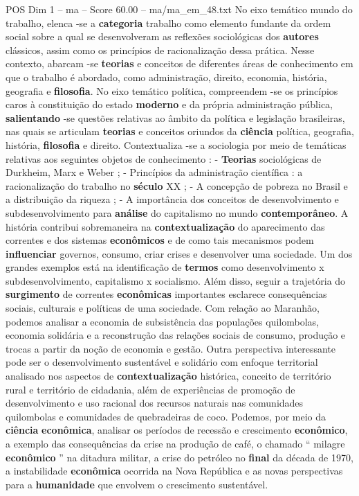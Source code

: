 \begin{textsample}{POS Dim 1 – ma – Score 60.00 – ma/ma\_em\_48.txt}
No eixo temático mundo do trabalho, elenca -se a \textbf{categoria} trabalho como elemento fundante da ordem social sobre a qual se desenvolveram as reflexões sociológicas dos \textbf{autores} clássicos, assim como os princípios de racionalização dessa prática.
Nesse contexto, abarcam -se \textbf{teorias} e conceitos de diferentes áreas de conhecimento em que o trabalho é abordado, como administração, direito, economia, história, geografia e \textbf{filosofia}.
No eixo temático política, compreendem -se os princípios caros à constituição do estado \textbf{moderno} e da própria administração pública, \textbf{salientando} -se questões relativas ao âmbito da política e legislação brasileiras, nas quais se articulam \textbf{teorias} e conceitos oriundos da \textbf{ciência} política, geografia, história, \textbf{filosofia} e direito.
Contextualiza -se a sociologia por meio de temáticas relativas aos seguintes objetos de conhecimento : - \textbf{Teorias} sociológicas de Durkheim, Marx e Weber ; - Princípios da administração científica : a racionalização do trabalho no \textbf{século} XX ; - A concepção de pobreza no Brasil e a distribuição da riqueza ; - A importância dos conceitos de desenvolvimento e subdesenvolvimento para \textbf{análise} do capitalismo no mundo \textbf{contemporâneo}.
A história contribui sobremaneira na \textbf{contextualização} do aparecimento das correntes e dos sistemas \textbf{econômicos} e de como tais mecanismos podem \textbf{influenciar} governos, consumo, criar crises e desenvolver uma sociedade.
Um dos grandes exemplos está na identificação de \textbf{termos} como desenvolvimento x subdesenvolvimento, capitalismo x socialismo.
Além disso, seguir a trajetória do \textbf{surgimento} de correntes \textbf{econômicas} importantes esclarece consequências sociais, culturais e políticas de uma sociedade.
Com relação ao Maranhão, podemos analisar a economia de subsistência das populações quilombolas, economia solidária e a reconstrução das relações sociais de consumo, produção e trocas a partir da noção de economia e gestão.
Outra perspectiva interessante pode ser o desenvolvimento sustentável e solidário com enfoque territorial analisado nos aspectos de \textbf{contextualização} histórica, conceito de território rural e território de cidadania, além de experiências de promoção de desenvolvimento e uso racional dos recursos naturais nas comunidades quilombolas e comunidades de quebradeiras de coco.
Podemos, por meio da \textbf{ciência} \textbf{econômica}, analisar os períodos de recessão e crescimento \textbf{econômico}, a exemplo das consequências da crise na produção de café, o chamado “ milagre \textbf{econômico} ” na ditadura militar, a crise do petróleo no \textbf{final} da década de 1970, a instabilidade \textbf{econômica} ocorrida na Nova República e as novas perspectivas para a \textbf{humanidade} que envolvem o crescimento sustentável.


\end{textsample}
